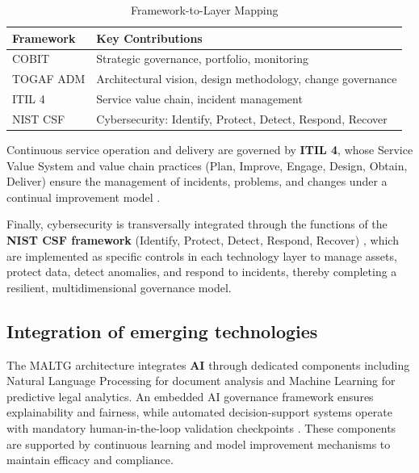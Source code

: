 \documentclass{IET-Conf-Paper}
\begin{document}
    \vspace{-2mm}
    \begin{table}[htbp]
    \caption{Framework-to-Layer Mapping}
    \label{tab:framework_mapping}
    \centering
    \small
    \begin{tabular}{@{}p{1.8cm}p{6.2cm}@{}}
    \toprule
    \textbf{Framework} & \textbf{Key Contributions} \\
    \midrule
    COBIT & Strategic governance, portfolio, monitoring \\
    \addlinespace[2pt]
    TOGAF ADM & Architectural vision, design methodology, change governance \\
    \addlinespace[2pt]
    ITIL 4 & Service value chain, incident management \\
    \addlinespace[2pt]
    NIST CSF & Cybersecurity: Identify, Protect, Detect, Respond, Recover \\
    \bottomrule
    \end{tabular}
    \end{table}

    \vspace{-2mm}
    Continuous service operation and delivery are governed by \textbf{ITIL 4}, whose Service Value System and value chain practices (Plan, Improve, Engage, Design, Obtain, Deliver) ensure the management of incidents, problems, and changes under a continual improvement model \cite{M_Suresh_2024}. 
    
    Finally, cybersecurity is transversally integrated through the functions of the \textbf{NIST CSF framework} (Identify, Protect, Detect, Respond, Recover) \cite{Diah_Sulistyowati_2020}, which are implemented as specific controls in each technology layer to manage assets, protect data, detect anomalies, and respond to incidents, thereby completing a resilient, multidimensional governance model.

    \subsection{Integration of emerging technologies}
    The  MALTG architecture integrates \textbf{AI} through dedicated components including Natural Language Processing for document analysis and Machine Learning for predictive legal analytics. An embedded AI governance framework ensures explainability and fairness, while automated decision-support systems operate with mandatory human-in-the-loop validation checkpoints \cite{McIntosh2024From}. These components are supported by continuous learning and model improvement mechanisms to maintain efficacy and compliance.
\end{document}

